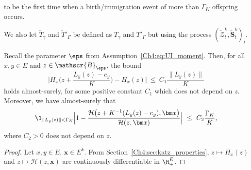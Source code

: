 \begin{refsegment}
    to be the first time when a birth/immigration event of more than $\Gamma_K$
    offspring occurs.
    
    We also let $\widetilde{T}_{\gamma}$ and $\widetilde{T}'_\Gamma$ be
    defined as $T_\gamma$ and $T'_\Gamma$ but using the process $(\widetilde{\mathcal Z}^k_t, \widetilde{\bm S}^k_t)_t$. 
\begin{lem}\label{lem:taylor_produit_H}
 Recall the parameter $\eps$ from Assumption~\ref{Ch4:eq:UI_moment}. Then, for all $x, y\in E$ and $z\in \mathscr{ B}_{\eps}$, the bound
\begin{equation*}
\Big| H_x\big(z+ \frac{L_y(z)-e_y}{K}\big)-H_x(z)\Big| \ \leq\   C_1\frac{\lVert L_y(z)\rVert}{K}
\end{equation*}
holds almost-surely, for some positive constant $C_1$ which does not depend on $z$.
 Moreover, we have almost-surely that  
\begin{equation*}
\1_{\lVert L_y(z)\rVert <\Gamma_K}\Big|1- \frac{\mathcal{H}\big(z+ K^{-1}(L_y(z)-e_y),\bm x\big)}{\mathcal{H}(z,\bm x)}\Big|\ \leq\  C_2\frac{\Gamma_K}{K},
\end{equation*}
where $C_2>0$ does not depend on $z$.
\end{lem} 
\begin{proof}
Let $x,y\in E$, $\bm x\in E^ k$. From Section~\ref{Ch4:sec:katz_properties}, $z\mapsto H_x(z)$ and $z\mapsto \mathcal H(z,\bm x)$ are continuously differentiable in $\R_+^E$.



\end{proof}
\end{refsegment}
